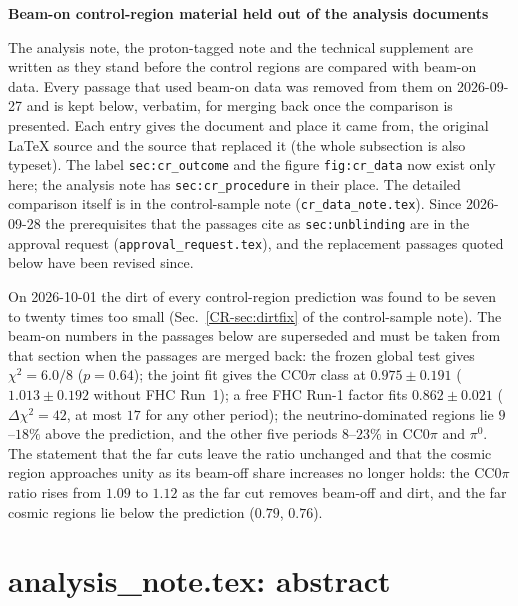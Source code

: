 \documentclass[11pt,a4paper]{article}
\newcommand{\crref}[2]{#1~\ref{CR-#2} of the control-sample note}
\begin{document}
\begin{center}
{\LARGE\bfseries Beam-on control-region material held out of the analysis documents\par}
\vspace{0.4cm}{\large 2026-09-27\par}
\end{center}

The analysis note, the proton-tagged note and the technical supplement are written as they stand
before the control regions are compared with beam-on data. Every passage that used beam-on data was
removed from them on 2026-09-27 and is kept below, verbatim, for merging back once the comparison is
presented. Each entry gives the document and place it came from, the original LaTeX source and the source
that replaced it (the whole subsection is also typeset). The label \texttt{sec:cr\_outcome} and the figure \texttt{fig:cr\_data} now
exist only here; the analysis note has \texttt{sec:cr\_procedure} in their place. The detailed
comparison itself is in the control-sample note (\texttt{cr\_data\_note.tex}). Since 2026-09-28 the
prerequisites that the passages cite as \texttt{sec:unblinding} are in the approval request
(\texttt{approval\_request.tex}), and the replacement passages quoted below have been revised since.

On 2026-10-01 the dirt of every control-region prediction was found to be seven to twenty times too small
(\crref{Sec.}{sec:dirtfix}). The beam-on numbers in the passages below are superseded and must be taken from
that section when the passages are merged back: the frozen global test gives $\chi^2=6.0/8$ ($p=0.64$); the
joint fit gives the CC$0\pi$ class at $0.975\pm0.191$ ($1.013\pm0.192$ without FHC Run~1); a free FHC Run-1
factor fits $0.862\pm0.021$ ($\Delta\chi^2=42$, at most $17$ for any other period); the neutrino-dominated
regions lie $9$--$18\%$ above the prediction, and the other five periods $8$--$23\%$ in CC$0\pi$ and $\pi^0$. The
statement that the far cuts leave the ratio unchanged and that the cosmic region approaches unity as its
beam-off share increases no longer holds: the CC$0\pi$ ratio rises from $1.09$ to $1.12$ as the far cut
removes beam-off and dirt, and the far cosmic regions lie below the prediction ($0.79$, $0.76$).

\section{analysis\_note.tex: abstract}
\end{document}
